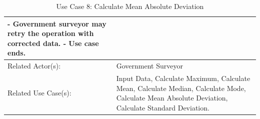 \begin{table}[h]
\begin{tabular}{ | p{4cm} | p{10cm} | }
{   - Government surveyor may retry the operation with corrected data. \newline
   - Use case ends.}\\
 \hline
 Related Actor(s): & Government Surveyor\\
 \hline
 Related Use Case(s): & Input Data, Calculate Maximum, Calculate Mean, Calculate Median, Calculate Mode, Calculate Mean Absolute Deviation, Calculate Standard Deviation.\\
 \hline
 \end{tabular}
\renewcommand{\thetable}{\arabic{table}}
\caption{Use Case 8: Calculate Mean Absolute Deviation}
\label{tab:table1}
\end{table}


\begin{table}[h]

\end{table}
